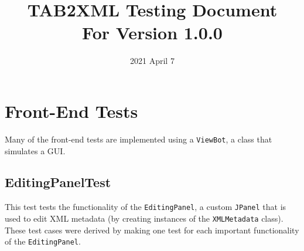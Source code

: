 \documentclass[11pt]{article}
\date{2021 April 7}
\title{TAB2XML Testing Document\\\medskip
\large For Version 1.0.0}
\begin{document}
\maketitle
\tableofcontents

\newpage

\section{Front-End Tests}
\label{sec:org71c6a0c}
Many of the front-end tests are implemented using a \texttt{ViewBot}, a class that simulates a GUI.
\subsection{EditingPanelTest}
\label{sec:org7970c6b}
This test tests the functionality of the \texttt{EditingPanel}, a custom \texttt{JPanel} that is used to edit XML metadata (by creating instances of the \texttt{XMLMetadata} class).  These test cases were derived by making one test for each important functionality of the \texttt{EditingPanel}.
\end{document}
